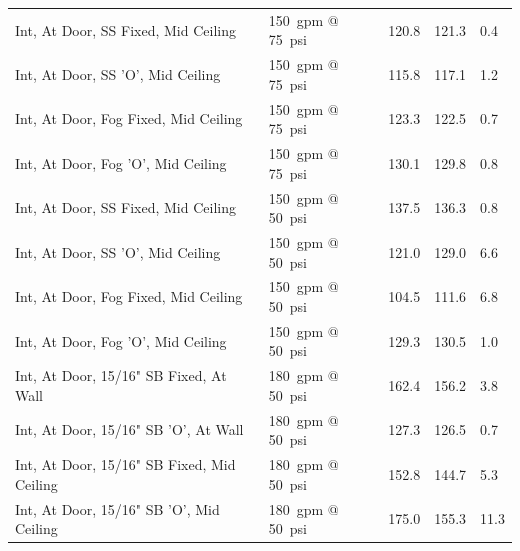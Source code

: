 \documentclass[12pt,oneside]{book}
\begin{document}
\begin{table}[!ht]
\begin{tabular}{lllll}
Int, At Door, SS Fixed, Mid Ceiling                   & 150~gpm @ 75~psi               & 120.8                             & 121.3                              & 0.4                    \\
Int, At Door, SS 'O', Mid Ceiling                     & 150~gpm @ 75~psi               & 115.8                             & 117.1                              & 1.2                    \\
Int, At Door, Fog Fixed, Mid Ceiling                  & 150~gpm @ 75~psi               & 123.3                             & 122.5                              & 0.7                    \\
Int, At Door, Fog 'O', Mid Ceiling                    & 150~gpm @ 75~psi               & 130.1                             & 129.8                              & 0.8                    \\
Int, At Door, SS Fixed, Mid Ceiling                   & 150~gpm @ 50~psi               & 137.5                             & 136.3                              & 0.8                    \\
Int, At Door, SS 'O', Mid Ceiling                     & 150~gpm @ 50~psi               & 121.0                             & 129.0                              & 6.6                    \\
Int, At Door, Fog Fixed, Mid Ceiling                  & 150~gpm @ 50~psi               & 104.5                             & 111.6                              & 6.8                    \\
Int, At Door, Fog 'O', Mid Ceiling                    & 150~gpm @ 50~psi               & 129.3                             & 130.5                              & 1.0                    \\
Int, At Door, 15/16" SB Fixed, At Wall                & 180~gpm @ 50~psi               & 162.4                             & 156.2                              & 3.8                    \\
Int, At Door, 15/16" SB 'O', At Wall                  & 180~gpm @ 50~psi               & 127.3                             & 126.5                              & 0.7                    \\
Int, At Door, 15/16" SB Fixed, Mid Ceiling            & 180~gpm @ 50~psi               & 152.8                             & 144.7                              & 5.3                    \\
Int, At Door, 15/16" SB 'O', Mid Ceiling              & 180~gpm @ 50~psi               & 175.0                             & 155.3                              & 11.3                   \\

\end{tabular}
\end{table}
\end{document}
